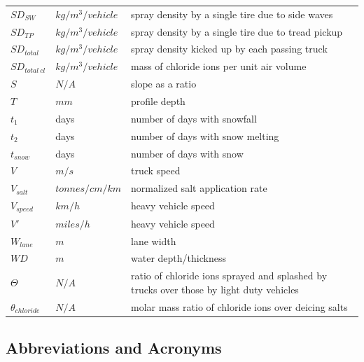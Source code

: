 \documentclass[12pt]{article}
\begin{document}
\begin{longtable*}{l l p{12cm}}
$SD_{SW}$ & $kg/m^{3}/vehicle$ & spray density by a single tire due to side waves\\
$SD_{TP}$ & $kg/m^{3}/vehicle$ & spray density by a single tire due to tread pickup\\
$SD_{total}$ & $kg/m^{3}/vehicle$ & spray density kicked up by each passing truck\\
$SD_{total~cl}$ & $kg/m^3/vehicle$ & mass of chloride ions per unit air volume\\
$S$ & $N/A$ & slope as a ratio\\
$T$ & $mm$ & profile depth\\
$t_1$ & days & number of days with snowfall\\
$t_2$ & days & number of days with snow melting\\
$t_{snow}$ & days & number of days with snow\\
$V$ & $m/s$ & truck speed\\
$V_{salt}$ & $tonnes/cm/km$ & normalized salt application rate\\
$V_{speed}$ & $km/h$ & heavy vehicle speed\\
$V'$ & $miles/h$ & heavy vehicle speed\\
$W_{lane}$ & $m$ & lane width\\
$WD$ & $m$ & water depth/thickness\\
$\Theta$ & $N/A$ & ratio of chloride ions sprayed and splashed by trucks over those by light duty vehicles\\
$\theta_{chloride}$ & $N/A$ & molar mass ratio of chloride ions over deicing salts\\
\bottomrule
\end{longtable*}

\subsection{Abbreviations and Acronyms}
\end{document}
